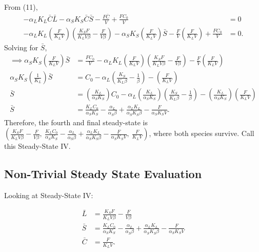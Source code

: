 \begin{enumerate}
    From (11), 
    \begin{align*}
      -\alpha_L K_L \bar{C}\bar{L} -\alpha_S K_S \bar{C}\bar{S} - \frac{F\bar{C}}{V} + \frac{FC_0}{V} &= 0 \\
      -\alpha_L K_L \left( \frac{F}{K_L V} \right) \left( \frac{K_S F}{K_L V \beta} - \frac{F}{V \beta} \right) -\alpha_S K_S \left( \frac{F}{K_L V} \right) \bar{S} - \frac{F}{V} \left( \frac{F}{K_L V} \right) + \frac{FC_0}{V} &= 0.
    \end{align*}
    Solving for $\bar{S}$,
    \begin{align*}
      \implies \alpha_S K_S \left( \frac{F}{K_L V} \right) \bar{S} &=  \frac{FC_0}{V} - \alpha_L K_L \left( \frac{F}{K_L V} \right) \left( \frac{K_S F}{K_L V \beta} - \frac{F}{V \beta} \right) - \frac{F}{V} \left( \frac{F}{K_L V} \right) \\ 
      \alpha_S K_S \left( \frac{1}{K_L} \right) \bar{S} &=  C_0 - \alpha_L \left( \frac{K_S}{K_L \beta} - \frac{1}{\beta} \right) - \left( \frac{F}{K_L V} \right) \\ 
      \bar{S} &= \left( \frac{K_L}{\alpha_S K_S} \right) C_0 - \alpha_L \left( \frac{K_L}{\alpha_S K_S} \right) \left( \frac{K_S}{K_L \beta} - \frac{1}{\beta} \right) - \left( \frac{K_L}{\alpha_S K_S} \right) \left( \frac{F}{K_L V} \right) \\ 
      \bar{S} &= \frac{K_L C_0}{\alpha_S K_S} - \frac{\alpha_L}{\alpha_S \beta} + \frac{\alpha_L K_L}{\alpha_S K_S \beta} - \frac{F}{\alpha_S K_S V}.
    \end{align*}
    Therefore, the fourth and final steady-state is {\color{red}$\left(\frac{K_S F}{K_L V \beta} - \frac{F}{V \beta},\ \frac{K_L C_0}{\alpha_S K_S} - \frac{\alpha_L}{\alpha_S \beta} + \frac{\alpha_L K_L}{\alpha_S K_S \beta} - \frac{F}{\alpha_S K_S V},\ \frac{F}{K_L V} \right)$}, where both species survive.  Call this {\color{red}Steady-State IV}. 
  \end{enumerate}

\subsection*{Non-Trivial Steady State Evaluation}

Looking at {\color{red}Steady-State IV}:

\begin{align*}
  \bar{L} &= \frac{K_S F}{K_L V \beta} - \frac{F}{V \beta} \\
  \bar{S} &= \frac{K_L C_0}{\alpha_S K_S} - \frac{\alpha_L}{\alpha_S \beta} + \frac{\alpha_L K_L}{\alpha_S K_S \beta} - \frac{F}{\alpha_S K_S V} \\
  \bar{C} &= \frac{F}{K_L V}. \\
\end{align*} 

